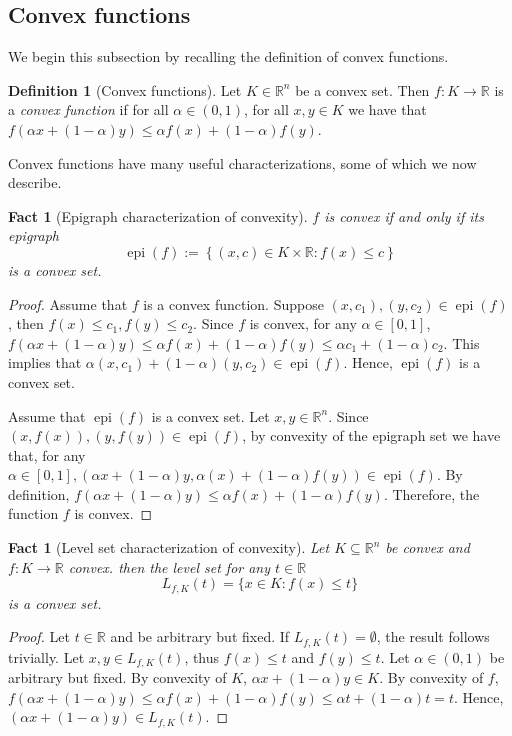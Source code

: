 \documentclass[smallextended,numbook,nospthms]{svjour3}
\theoremstyle{plain}
\newtheorem{fact}[theorem]{Fact}
\theoremstyle{definition}
\newtheorem{definition}[theorem]{Definition}
\def\RR{\mathds R}
\DeclareMathOperator{\epi}{epi}
\begin{document}
\subsection{Convex functions}

We begin this subsection by recalling the definition of convex functions.
\begin{definition}[Convex functions]\label{def:convex f}
	Let $K \in \RR^n$ be a convex set. Then $f:K \rightarrow \RR$ is a \emph{convex function} if for all $\alpha \in (0,1)$, for all $x, y \in K$ we have that $f\left(\alpha x+(1-\alpha) y\right) \leq \alpha f\left(x\right)+(1-\alpha) f\left(y\right)$.
\end{definition}

Convex functions have many useful characterizations, some of which we now describe.

\begin{fact}[Epigraph characterization of convexity]\label{fact:conv char epi}
$f$ is convex if and only if its epigraph
$$
\epi(f):=\left\{(x, c) \in K \times \RR: f(x) \leq c\right\}
$$
is a convex set.
\end{fact}
\begin{proof}
	Assume that $f$ is a convex function. Suppose $\left(x, c_{1}\right),\left(y, c_{2}\right) \in \operatorname{epi}(f)$, then $f(x) \leq c_{1}, f(y) \leq c_{2}$. Since $f$ is convex, for any $\alpha \in[0,1]$, $f(\alpha x+(1-\alpha) y) \leq \alpha f(x)+(1-\alpha) f(y) \leq \alpha c_{1}+(1-\alpha) c_{2}$. This implies that $\alpha\left(x, c_{1}\right)+(1-\alpha)\left(y, c_{2}\right) \in \epi (f)$. Hence, $\epi(f)$ is a convex set.
	
	Assume that $\epi(f)$ is a convex set. Let $x, y \in \RR^{n}$. Since $(x, f(x)),(y, f(y)) \in \epi(f)$, by convexity of the epigraph set we have that, for any $\alpha \in[0,1],(\alpha x+(1-\alpha) y, \alpha(x)+(1-\alpha) f(y)) \in \epi(f)$. By definition, $f(\alpha x+(1-\alpha) y) \leq \alpha f(x)+(1-\alpha) f(y)$. Therefore, the function $f$ is convex.
\end{proof}


\begin{fact}[Level set characterization of convexity]\label{fact:conv level set}
	Let $K \subseteq \RR^n$ be convex and $f:K \rightarrow \RR$ convex. then the level set for any $t \in \RR$
	$$
	L_{f,K}(t)=\{x \in K: f(x) \leq t\}
	$$
	is a convex set.
\end{fact}
\begin{proof}
	Let $t \in \RR$ and be arbitrary but fixed. If $L_{f,K}(t) = \emptyset$, the result follows trivially.
	Let $x,y \in L_{f,K}(t)$, thus $f(x) \leq t$ and $f(y) \leq t$. Let $\alpha \in (0,1)$ be arbitrary but fixed.
	By convexity of $K$,  $\alpha x + (1-\alpha)y \in K$. By convexity of $f$, $f(\alpha x + (1-\alpha)y) \leq \alpha f(x) + (1-\alpha) f(y) \leq \alpha t + (1-\alpha) t = t$. Hence, $(\alpha x + (1-\alpha)y) \in L_{f,K}(t)$.
\end{proof}
\end{document}
